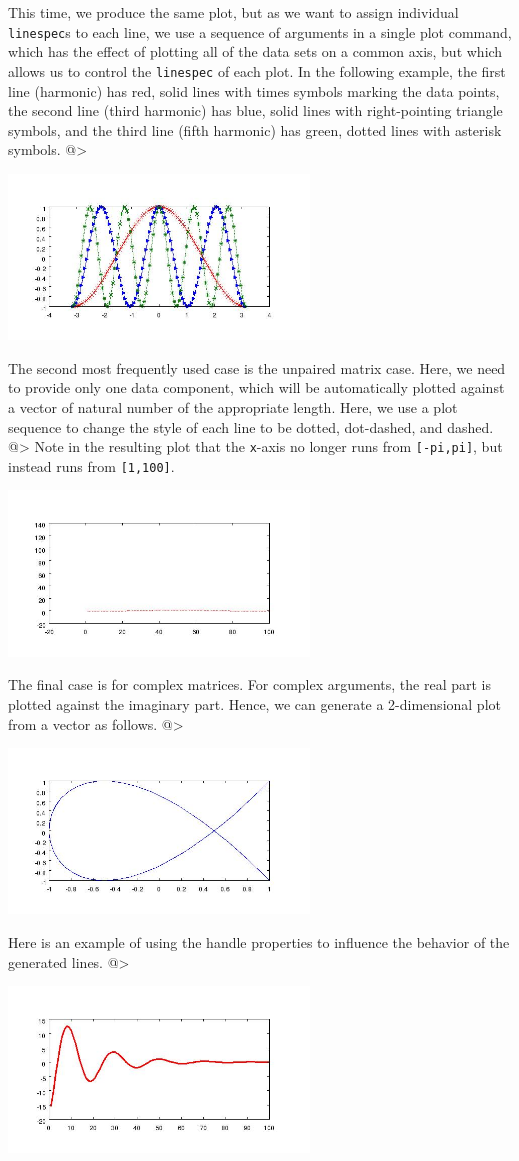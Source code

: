 This time, we produce the same plot, but as we want to assign individual
\verb|linespec|s to each line, we use a sequence of arguments in a single plot
command, which has the effect of plotting all of the data sets on a common 
axis, but which allows us to control the \verb|linespec| of each plot. In 
the following example, the first line (harmonic) has red, solid lines with 
times symbols
marking the data points, the second line (third harmonic) has blue, solid lines
with right-pointing triangle symbols, and the third line (fifth harmonic) has
green, dotted lines with asterisk symbols.
@>


\centerline{\includegraphics[width=8cm]{plot3}}


The second most frequently used case is the unpaired matrix case.  Here, we need
to provide only one data component, which will be automatically plotted against
a vector of natural number of the appropriate length.  Here, we use a plot sequence
to change the style of each line to be dotted, dot-dashed, and dashed.
@>
Note in the resulting plot that the \verb|x|-axis no longer runs from \verb|[-pi,pi]|, but 
instead runs from \verb|[1,100]|.


\centerline{\includegraphics[width=8cm]{plot4}}


The final case is for complex matrices.  For complex arguments, the real part is
plotted against the imaginary part.  Hence, we can generate a 2-dimensional plot
from a vector as follows.
@>


\centerline{\includegraphics[width=8cm]{plot5}}


Here is an example of using the handle properties to influence the behavior
of the generated lines.
@>


\centerline{\includegraphics[width=8cm]{plot6}}

